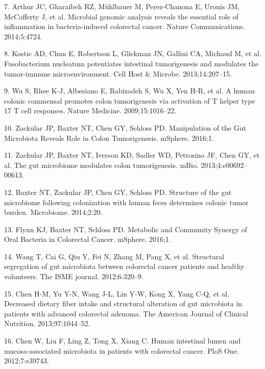 \documentclass[12pt,]{article}
\begin{document}
\hypertarget{ref-arthur_microbial_2014}{}
7. Arthur JC, Gharaibeh RZ, Mühlbauer M, Perez-Chanona E, Uronis JM,
McCafferty J, et al. Microbial genomic analysis reveals the essential
role of inflammation in bacteria-induced colorectal cancer. Nature
Communications. 2014;5:4724.

\hypertarget{ref-kostic_fusobacterium_2013}{}
8. Kostic AD, Chun E, Robertson L, Glickman JN, Gallini CA, Michaud M,
et al. Fusobacterium nucleatum potentiates intestinal tumorigenesis and
modulates the tumor-immune microenvironment. Cell Host \& Microbe.
2013;14:207--15.

\hypertarget{ref-wu_human_2009}{}
9. Wu S, Rhee K-J, Albesiano E, Rabizadeh S, Wu X, Yen H-R, et al. A
human colonic commensal promotes colon tumorigenesis via activation of T
helper type 17 T cell responses. Nature Medicine. 2009;15:1016--22.

\hypertarget{ref-zackular_manipulation_2016}{}
10. Zackular JP, Baxter NT, Chen GY, Schloss PD. Manipulation of the Gut
Microbiota Reveals Role in Colon Tumorigenesis. mSphere. 2016;1.

\hypertarget{ref-zackular_gut_2013}{}
11. Zackular JP, Baxter NT, Iverson KD, Sadler WD, Petrosino JF, Chen
GY, et al. The gut microbiome modulates colon tumorigenesis. mBio.
2013;4:e00692--00613.

\hypertarget{ref-baxter_structure_2014}{}
12. Baxter NT, Zackular JP, Chen GY, Schloss PD. Structure of the gut
microbiome following colonization with human feces determines colonic
tumor burden. Microbiome. 2014;2:20.

\hypertarget{ref-flynn_metabolic_2016}{}
13. Flynn KJ, Baxter NT, Schloss PD. Metabolic and Community Synergy of
Oral Bacteria in Colorectal Cancer. mSphere. 2016;1.

\hypertarget{ref-wang_structural_2012}{}
14. Wang T, Cai G, Qiu Y, Fei N, Zhang M, Pang X, et al. Structural
segregation of gut microbiota between colorectal cancer patients and
healthy volunteers. The ISME journal. 2012;6:320--9.

\hypertarget{ref-chen_decreased_2013}{}
15. Chen H-M, Yu Y-N, Wang J-L, Lin Y-W, Kong X, Yang C-Q, et al.
Decreased dietary fiber intake and structural alteration of gut
microbiota in patients with advanced colorectal adenoma. The American
Journal of Clinical Nutrition. 2013;97:1044--52.

\hypertarget{ref-chen_human_2012}{}
16. Chen W, Liu F, Ling Z, Tong X, Xiang C. Human intestinal lumen and
mucosa-associated microbiota in patients with colorectal cancer. PloS
One. 2012;7:e39743.
\end{document}
